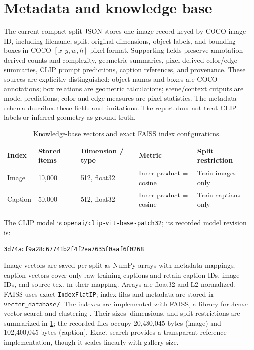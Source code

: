 \section{Metadata and knowledge base}
The current compact split JSON stores one image record keyed by COCO image ID, including filename, split, original dimensions, object labels, and bounding boxes in COCO $[x,y,w,h]$ pixel format. Supporting fields preserve annotation-derived counts and complexity, geometric summaries, pixel-derived color/edge summaries, CLIP prompt predictions, caption references, and provenance. These sources are explicitly distinguished: object names and boxes are COCO annotations; box relations are geometric calculations; scene/context outputs are model predictions; color and edge measures are pixel statistics. The metadata schema describes these fields and limitations. The report does not treat CLIP labels or inferred geometry as ground truth.

\begin{table}[htbp]\centering\caption{Knowledge-base vectors and exact FAISS index configurations.}\label{tab:index}
\begin{tabularx}{\textwidth}{lXXXX}\toprule Index & Stored items & Dimension / type & Metric & Split restriction\\\midrule Image & 10,000 & 512, float32 & Inner product = cosine & Train images only\\Caption & 50,000 & 512, float32 & Inner product = cosine & Train captions only\\\bottomrule\end{tabularx}\end{table}

The CLIP model is \texttt{openai/clip-vit-base-patch32}; its recorded model revision is:
\begin{center}\small\texttt{3d74acf9a28c67741b2f4f2ea7635f0aaf6f0268}\end{center}
Image vectors are saved per split as NumPy arrays with metadata mappings; caption vectors cover only raw training captions and retain caption IDs, image IDs, and source text in their mapping. Arrays are float32 and L2-normalized. FAISS uses exact \texttt{IndexFlatIP}; index files and metadata are stored in \texttt{vector\_database/}. The indexes are implemented with FAISS, a library for dense-vector search and clustering \cite{douze2024faiss}. Their sizes, dimensions, and split restrictions are summarized in \cref{tab:index}; the recorded files occupy 20,480,045 bytes (image) and 102,400,045 bytes (caption). Exact search provides a transparent reference implementation, though it scales linearly with gallery size.
